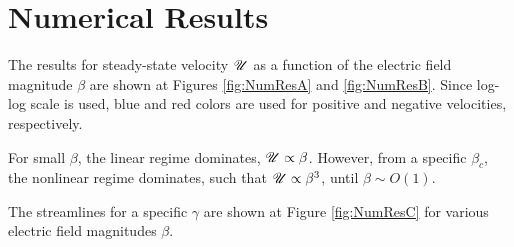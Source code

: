 \section{Numerical Results}
The results for steady-state velocity $\mathscr{U}$ as a function of the electric field magnitude $\beta$
are shown at Figures \ref{fig:NumResA} and \ref{fig:NumResB}. 
Since log-log scale is used, blue and red colors are used 
for positive and negative velocities, respectively.

For small $\beta$, the linear regime dominates, $\mathscr{U} \propto \beta$. 
However, from a specific $\beta_c$, the nonlinear regime dominates, such that
$\mathscr{U} \propto \beta^3$, until $\beta \sim O(1)$.

The streamlines for a specific $\gamma$ are shown at Figure \ref{fig:NumResC} for
various electric field magnitudes $\beta$.

